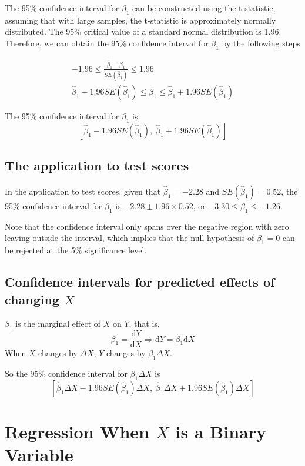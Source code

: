 \documentclass[a4paper,11pt]{article}
\newcommand{\dx}{\mathrm{d}}
\begin{document}
The 95\% confidence interval for \(\beta_1\) can be constructed using the
t-statistic, assuming that with large samples, the t-statistic is
approximately normally distributed. The 95\% critical value of a
standard normal distribution is 1.96. Therefore, we can obtain the 95\%
confidence interval for \(\beta_1\) by the following steps

\begin{gather*}
-1.96 \leq \frac{\hat{\beta}_1 - \beta_1}{SE(\hat{\beta}_1)} \leq 1.96 \\
\hat{\beta}_1 - 1.96 SE(\hat{\beta}_1) \leq \beta_1 \leq \hat{\beta}_1 + 1.96 SE(\hat{\beta}_1)
\end{gather*}

The 95\% confidence interval for \(\beta_1\) is 
\[ \left[ \hat{\beta}_1 - 1.96 SE(\hat{\beta}_1),\; \hat{\beta}_1 + 1.96
SE(\hat{\beta}_1) \right] \]


\subsection{The application to test scores}
\label{sec:org637a0d2}

In the application to test scores, given that \(\hat{\beta}_1 = -2.28\)
and \(SE(\hat{\beta}_1) = 0.52\), the 95\% confidence interval for
\(\beta_1\) is \({-2.28 \pm 1.96 \times 0.52}\), or \(-3.30 \leq \beta_1
\leq -1.26\). 

Note that the confidence interval only spans over the negative
region with zero leaving outside the interval, which implies that the
null hypothesis of \(\beta_1 = 0\) can be rejected at the 5\%
significance level.


\subsection{Confidence intervals for predicted effects of changing \(X\)}
\label{sec:org277d763}

\(\beta_1\) is the marginal effect of \(X\) on \(Y\), that is, 
\[ \beta_1 = \frac{\dx Y}{ \dx X} \Rightarrow \dx Y = \beta_1 \dx X \]
When \(X\) changes by \(\Delta X\), \(Y\) changes by \(\beta_1 \Delta X\). 

So the 95\% confidence interval for \(\beta_1 \Delta X\) is
\[ \left[ \hat{\beta}_1 \Delta X - 1.96 SE(\hat{\beta}_1) \Delta X,\;
\hat{\beta}_1 \Delta X + 1.96SE(\hat{\beta}_1) \Delta X \right] \]


\section{Regression When \(X\) is a Binary Variable}
\label{sec:orge2f59cf}
\end{document}

